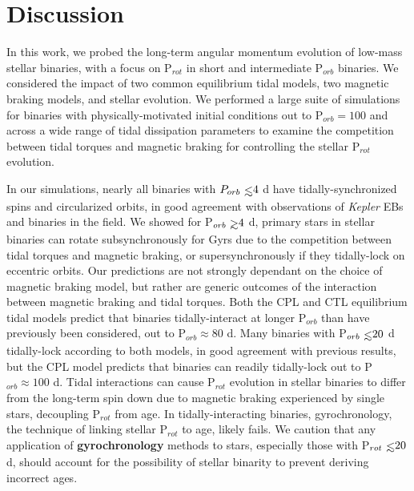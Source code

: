 \documentclass[twocolumn]{aastex61}
\def\gsim{~\rlap{$>$}{\lower 1.0ex\hbox{$\sim$}}}
\def\lsim{~\rlap{$<$}{\lower 1.0ex\hbox{$\sim$}}}
\newcommand{\xxx}[1]{{\textbf{#1}}}
\newcommand{\kepler}[0]{\textit{Kepler}\xspace}
\begin{document}
\section{Discussion} \label{sec:discussion}

In this work, we probed the long-term angular momentum evolution of low-mass stellar binaries, with a focus on P$_{rot}$ in short and intermediate P$_{orb}$ binaries.  We considered the impact of two common equilibrium tidal models, two magnetic braking models, and stellar evolution.  We performed a large suite of simulations for binaries with physically-motivated initial conditions out to P$_{orb} = 100$ and across a wide range of tidal dissipation parameters to examine the competition between tidal torques and magnetic braking for controlling the stellar P$_{rot}$ evolution. 

In our simulations, nearly all binaries with $P_{orb} \lsim 4$ d have tidally-synchronized spins and circularized orbits, in good agreement with observations of \kepler EBs and binaries in the field. We showed for P$_{orb} \gsim 4$ d, primary stars in stellar binaries can rotate subsynchronously for Gyrs due to the competition between tidal torques and magnetic braking, or supersynchronously if they tidally-lock on eccentric orbits. Our predictions are not strongly dependant on the choice of magnetic braking model, but rather are generic outcomes of the interaction between magnetic braking and tidal torques.  Both the CPL and CTL equilibrium tidal models predict that binaries tidally-interact at longer P$_{orb}$ than have previously been considered, out to P$_{orb} \approx 80$ d. Many binaries with P$_{orb} \lsim 20$ d tidally-lock according to both models, in good agreement with previous results, but the CPL model predicts that binaries can readily tidally-lock out to P$_{orb} \approx 100$ d. Tidal interactions can cause P$_{rot}$ evolution in stellar binaries to differ from the long-term spin down due to magnetic braking experienced by single stars, decoupling P$_{rot}$ from age.  In tidally-interacting binaries, gyrochronology, the technique of linking stellar P$_{rot}$ to age, likely fails. We caution that any application of \xxx{gyrochronology} methods to stars, especially those with P$_{rot} \lsim 20$ d, should account for the possibility of stellar binarity to prevent deriving incorrect ages.  
\end{document}
